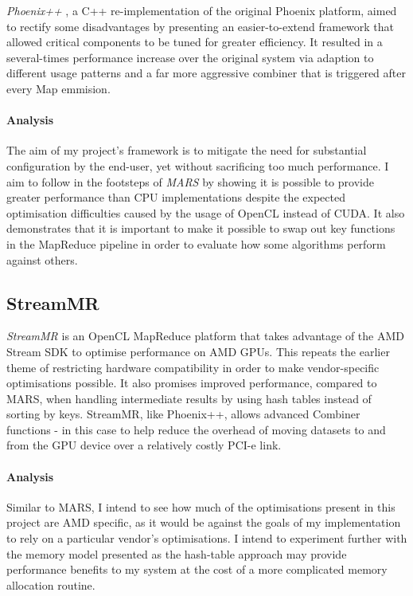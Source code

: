 \emph{Phoenix++} \cite{phoenix++}, a C++ re-implementation of the original Phoenix platform, aimed to rectify some disadvantages by presenting an easier-to-extend framework that allowed critical components to be tuned for greater efficiency. It resulted in a several-times performance increase over the original system via adaption to different usage patterns and a far more aggressive combiner that is triggered after every Map emmision.

\paragraph{Analysis}
The aim of my project's framework is to mitigate the need for substantial configuration by the end-user, yet without sacrificing too much performance. I aim to follow in the footsteps of \emph{MARS} by showing it is possible to provide greater performance than CPU implementations despite the expected optimisation difficulties caused by the usage of OpenCL instead of CUDA.
It also demonstrates that it is important to make it possible to swap out key functions in the MapReduce pipeline in order to evaluate how some algorithms perform against others.

\subsection{StreamMR}
\emph{StreamMR} \cite{streammr} is an OpenCL MapReduce platform that takes advantage of the AMD Stream SDK to optimise performance on AMD \ac{GPUs}. This repeats the earlier theme of restricting hardware compatibility in order to make vendor-specific optimisations possible. It also promises improved performance, compared to MARS, when handling intermediate results by using hash tables instead of sorting by keys. StreamMR, like Phoenix++, allows advanced Combiner functions - in this case to help reduce the overhead of moving datasets to and from the GPU device over a relatively costly PCI-e link.

\paragraph{Analysis}
Similar to MARS, I intend to see how much of the optimisations present in this project are AMD specific, as it would be against the goals of my implementation to rely on a particular vendor's optimisations. I intend to experiment further with the memory model presented as the hash-table approach may provide performance benefits to my system at the cost of a more complicated memory allocation routine.
